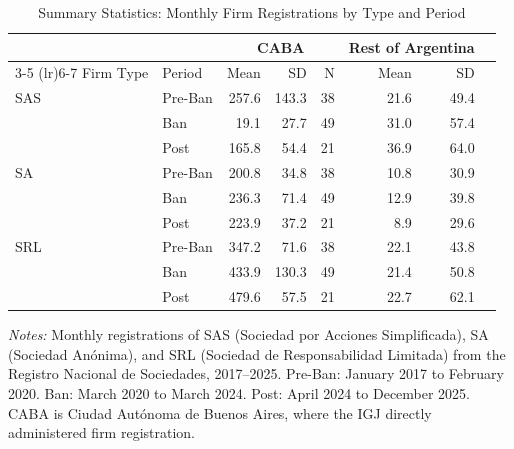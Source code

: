 \begin{table}[htbp]
\centering
\caption{Summary Statistics: Monthly Firm Registrations by Type and Period}
\label{tab:summary}
\begin{tabular}{llrrrrrr}
\toprule
 & & \multicolumn{3}{c}{CABA} & \multicolumn{2}{c}{Rest of Argentina} \\
\cmidrule(lr){3-5} \cmidrule(lr){6-7}
Firm Type & Period & Mean & SD & N & Mean & SD \\
\midrule
SAS & Pre-Ban & 257.6 & 143.3 & 38 & 21.6 & 49.4 \\
 & Ban & 19.1 & 27.7 & 49 & 31.0 & 57.4 \\
 & Post & 165.8 & 54.4 & 21 & 36.9 & 64.0 \\
\addlinespace SA & Pre-Ban & 200.8 & 34.8 & 38 & 10.8 & 30.9 \\
 & Ban & 236.3 & 71.4 & 49 & 12.9 & 39.8 \\
 & Post & 223.9 & 37.2 & 21 & 8.9 & 29.6 \\
\addlinespace SRL & Pre-Ban & 347.2 & 71.6 & 38 & 22.1 & 43.8 \\
 & Ban & 433.9 & 130.3 & 49 & 21.4 & 50.8 \\
 & Post & 479.6 & 57.5 & 21 & 22.7 & 62.1 \\
\bottomrule
\end{tabular}
\par\vspace{0.3em}\begin{minipage}{\textwidth}\footnotesize
\textit{Notes:} Monthly registrations of SAS (Sociedad por Acciones Simplificada), SA (Sociedad An\'onima), and SRL (Sociedad de Responsabilidad Limitada) from the Registro Nacional de Sociedades, 2017--2025. Pre-Ban: January 2017 to February 2020. Ban: March 2020 to March 2024. Post: April 2024 to December 2025. CABA is Ciudad Aut\'onoma de Buenos Aires, where the IGJ directly administered firm registration.
\end{minipage}
\end{table}
